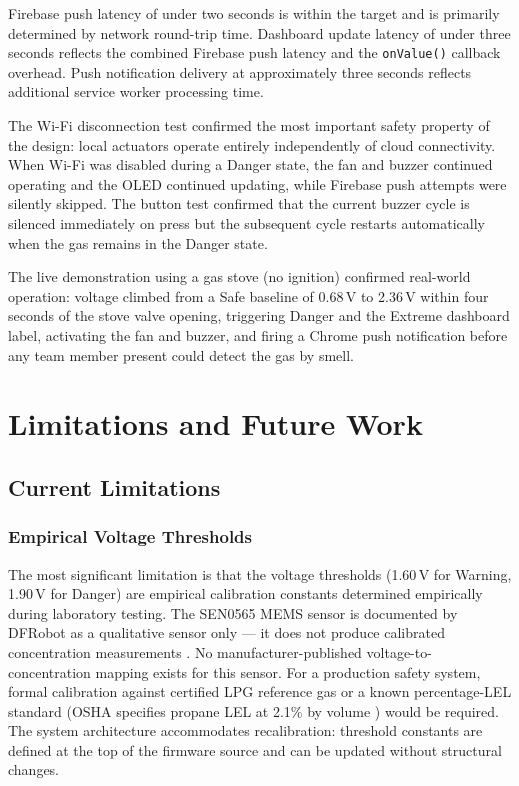 \documentclass[a4paper,10pt,conference,onecolumn]{IEEEtran}
\begin{document}
Firebase push latency of under two seconds is within the target and is
primarily determined by network round-trip time. Dashboard update latency of
under three seconds reflects the combined Firebase push latency and the
\texttt{onValue()} callback overhead. Push notification delivery at
approximately three seconds reflects additional service worker processing
time.

The Wi-Fi disconnection test confirmed the most important safety property of
the design: local actuators operate entirely independently of cloud
connectivity. When Wi-Fi was disabled during a Danger state, the fan and
buzzer continued operating and the OLED continued updating, while Firebase
push attempts were silently skipped. The button test confirmed that the
current buzzer cycle is silenced immediately on press but the subsequent
cycle restarts automatically when the gas remains in the Danger state.

The live demonstration using a gas stove (no ignition) confirmed real-world
operation: voltage climbed from a Safe baseline of 0.68\,V to 2.36\,V within
four seconds of the stove valve opening, triggering Danger and the Extreme
dashboard label, activating the fan and buzzer, and firing a Chrome push
notification before any team member present could detect the gas by smell.

\section{Limitations and Future Work}
\label{sec:limitations}

\subsection{Current Limitations}

\subsubsection{Empirical Voltage Thresholds}
The most significant limitation is that the voltage thresholds (1.60\,V for
Warning, 1.90\,V for Danger) are empirical calibration constants determined
empirically during laboratory testing. The SEN0565 MEMS sensor is documented
by DFRobot as a qualitative sensor only --- it does not produce calibrated
concentration measurements \cite{sen0565wiki}. No manufacturer-published
voltage-to-concentration mapping exists for this sensor. For a production
safety system, formal calibration against certified LPG reference gas or a
known percentage-LEL standard (OSHA specifies propane LEL at 2.1\% by
volume \cite{osha2024}) would be required. The system architecture
accommodates recalibration: threshold constants are defined at the top of
the firmware source and can be updated without structural changes.
\end{document}
